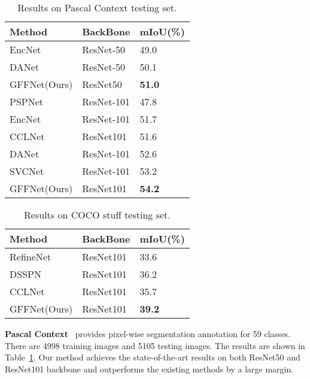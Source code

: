 \documentclass[letterpaper]{article} \usepackage{aaai20}  \usepackage{times}  \usepackage{helvet} \usepackage{courier}  \usepackage[hyphens]{url}  \usepackage{graphicx} \urlstyle{rm} \def\UrlFont{\rm}  \usepackage{graphicx}  \usepackage{amsmath}
\begin{document}
    \begin{table}[!t]
    	\centering
    	\footnotesize
    	\setlength{\tabcolsep}{2.0 pt}
    	\begin{tabular}{l|l|l}
    		\hline
    		Method & BackBone & mIoU(\%) \\
    		\hline
    		EncNet~\cite{context_encoding}  & ResNet-50   &49.0  \\
    		DANet~\cite{DAnet}&ResNet-50  & 50.1   \\
    		\hline
    		GFFNet(Ours) & ResNet50 & \textbf{51.0} \\
    		\hline
    	    PSPNet~\cite{pspnet}&ResNet-101   &47.8  \\
            EncNet~\cite{context_encoding}  & ResNet-101   &51.7  \\
            CCLNet~\cite{ding2018context} & ResNet101 & 51.6 \\
DANet~\cite{DAnet}& ResNet-101  & 52.6   \\
            SVCNet~\cite{SVCNet} & ResNet-101 & 53.2 \\
    		\hline
    		GFFNet(Ours) & ResNet101 & \textbf{54.2} \\
    		\hline
    	\end{tabular}
    	\caption{Results on Pascal Context testing set. }
    	\label{tab:pascal_context}
    \end{table}


    \begin{table}[!t]
		\centering
		\footnotesize
		\setlength{\tabcolsep}{2.0 pt}
		\begin{tabular}{l|l|l}
			\hline
			Method & BackBone & mIoU(\%) \\
			\hline
			RefineNet~\cite{refinenet} & ResNet101 & 33.6\\
			DSSPN~\cite{DSSPN} & ResNet101 & 36.2 \\
			CCLNet~\cite{ding2018context} & ResNet101 & 35.7 \\
			\hline
			GFFNet(Ours) & ResNet101 & \textbf{39.2} \\
			\hline
		\end{tabular}
		\caption{Results on COCO stuff testing set. }
		\label{tab:coco_stuff}
	\end{table}



\noindent
\textbf{Pascal Context}~\cite{pcontext-data} provides pixel-wise segmentation annotation for 59 classes. There are 4998 training images and 5105 testing images. The results are shown in Table~\ref{tab:pascal_context}. Our method achieves the state-of-the-art results on both ResNet50 and ResNet101 backbone and outperforms the existing methods by
a large margin. 
\end{document}
